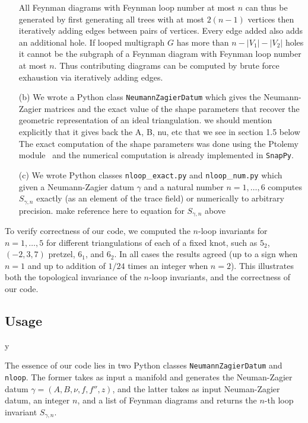 \documentclass[12pt]{amsart}
\theoremstyle{definition}
\def\printname#1{
        \if\draft y
                \smash{\makebox[0pt]{\hspace{-0.5in}
                        \raisebox{8pt}{\tt\tiny #1}}}
        \fi
}
\def\lbl#1{\label{#1}\printname{#1}}
\def\ga{\gamma}
\begin{document}
\begin{itemize}
All Feynman diagrams with Feynman loop number at most $n$ can thus be generated by first generating all trees with at most $2(n-1)$ vertices then iteratively adding edges between pairs of vertices. 
Every edge added also adds an additional hole. 
If looped multigraph $G$ has more than $n-|V_1|-|V_2|$ holes it cannot be the subgraph of a Feynman diagram with Feynman loop number at most $n$.
Thus contributing diagrams can be computed by brute force exhaustion via iteratively adding edges.

\item[(b)]
We wrote a Python class \texttt{NeumannZagierDatum} which gives the 
Neumann-Zagier matrices and the exact value of the shape parameters
that recover the geometric representation of an ideal triangulation.
{\color{red} we should mention explicitly that
it gives back the A, B, nu, etc that we see in section 1.5 below} 
The exact computation of the shape parameters was done using the Ptolemy
module~\cite{Ga:ptolemy,snappy} and the numerical computation is already
implemented in \texttt{SnapPy}.

\item[(c)]
We wrote Python classes \texttt{nloop}\_\texttt{exact.py} 
and \texttt{nloop}\_\texttt{num.py} which given a Neumann-Zagier datum $\ga$
and a natural number $n=1,\dots,6$ computes $S_{\gamma,n}$ exactly (as 
an element of the trace field) or numerically to arbitrary precision.
{\color{red} make reference here to equation for $S_{\gamma,n}$ above}
\end{itemize}

To verify correctness of our code, we computed the $n$-loop invariants for
$n=1,\dots,5$ for different triangulations of each of a fixed knot, such 
as $5_2$, $(-2,3,7)$ pretzel, $6_1$, and $6_2$. In all cases the results 
agreed (up to a sign when $n=1$ and up to addition of $1/24$ times an integer 
when $n=2$). This illustrates both the topological invariance of the 
$n$-loop invariants, and the correctness of our code.

\subsection{Usage}
\lbl{sub.usage}

The essence of our code lies in two Python classes \texttt{NeumannZagierDatum}
and \texttt{nloop}. The former takes as input a manifold and generates the 
Neuman-Zagier datum $\ga=(A,B,\nu,f,f'',z)$, and the latter takes as input
Neuman-Zagier datum, an integer $n$, and a list of Feynman diagrams
and returns the $n$-th loop invariant $S_{\gamma,n}$.
\end{document}
